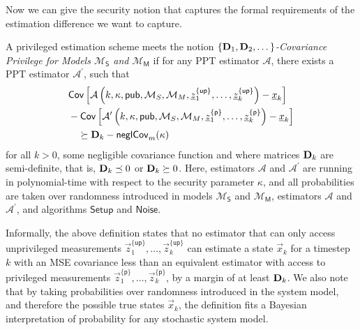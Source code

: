 Now we can give the security notion that captures the formal requirements of the estimation difference we want to capture.
\begin{definition}\label{def:priv_estimation:covariance_privilege_notion}
    A privileged estimation scheme meets the notion \textit{$\{{{\mathbf{D}}}_1,{{\mathbf{D}}}_2,\dots\}$-Covariance Privilege for Models $\mathcal{M}_{\mathsf{S}}$ and $\mathcal{M}_{\mathsf{M}}$} if for any PPT estimator $\mathcal{A}$, there exists a PPT estimator $\mathcal{A}^\prime$, such that
    \begin{equation}\label{eq:priv_estimation:covariance_privilege}
        \begin{split}
            &\mathsf{Cov}\left[\mathcal{A}\left(k, \kappa, \mathsf{pub}, \mathcal{M}_S, \mathcal{M}_M, {\underline{z}}_1^{\{\mathsf{up}\}},\dots,{\underline{z}}_k^{\{\mathsf{up}\}}\right) - {\underline{x}}_k \right]\\
            &-\mathsf{Cov}\left[\mathcal{A}^\prime\left(k, \kappa, \mathsf{pub}, \mathcal{M}_S, \mathcal{M}_M, {\underline{z}}_1^{\{\mathsf{p}\}},\dots,{\underline{z}}_k^{\{\mathsf{p}\}}\right) - {\underline{x}}_k \right]\\
            &\quad\succeq {\ensuremath{{\mathbf{D}}}}_k - \mathsf{neglCov}_m(\kappa)
        \end{split}
    \end{equation}
   for all $k>0$, some negligible covariance function and where matrices ${{\mathbf{D}}}_k$ are semi-definite, that is, ${{\mathbf{D}}}_k\preceq 0$ or ${{\mathbf{D}}}_k\succeq 0$. Here, estimators $\mathcal{A}$ and $\mathcal{A}^\prime$ are running in polynomial-time with respect to the security parameter $\kappa$, and all probabilities are taken over randomness introduced in models $\mathcal{M}_{\mathsf{S}}$ and $\mathcal{M}_{\mathsf{M}}$, estimators $\mathcal{A}$ and $\mathcal{A}^\prime$, and algorithms $\mathsf{Setup}$ and $\mathsf{Noise}$.
\end{definition}

Informally, the above definition states that no estimator that can only access unprivileged measurements $\vec{z}_1^{\{\mathsf{up}\}},\dots,\vec{z}_k^{\{\mathsf{up}\}}$ can estimate a state $\vec{x}_k$ for a timestep $k$ with an MSE covariance less than an equivalent estimator with access to privileged measurements $\vec{z}_1^{\{\mathsf{p}\}},\dots,\vec{z}_k^{\{\mathsf{p}\}}$, by a margin of at least ${{\mathbf{D}}}_k$. We also note that by taking probabilities over randomness introduced in the system model, and therefore the possible true states $\vec{x}_k$, the definition fits a Bayesian interpretation of probability for any stochastic system model.

